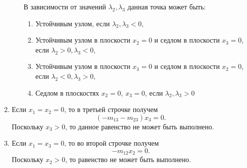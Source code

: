 \begin{enumerate}
\begin{enumerate}
            В зависимости от значений \( \lambda_2, \lambda_3 \) данная точка может быть:
            \begin{enumerate}
                \item Устойчивым узлом, если \( \lambda_2, \lambda_3 < 0 \),
                \item Устойчивым узлом в плоскости \( x_2 = 0 \) и седлом в плоскости \( x_3 = 0 \), если \( \lambda_2 > 0, \lambda_3 < 0 \),
                \item Устойчивым узлом в плоскости \( x_3 = 0 \) и седлом в плоскости \( x_2 = 0 \), если \( \lambda_2 < 0, \lambda_3 > 0 \),
                \item Седлом в плоскостях \( x_2 = 0, ~ x_3 = 0 \), если \( \lambda_2, \lambda_3 > 0 \)
            \end{enumerate}
            
            
        \end{enumerate}


        \item Если \( x_1 = x_2 = 0 \), то в третьей строчке получем
        \[ \left( -m_{13} -m_{23} \right) x_3 = 0. \]
        Поскольку \( x_3 > 0\), то данное равенство не может быть выполнено.


        \item Если \( x_1 = x_3 = 0 \), то во второй строчке получем
        \[ -m_{12} x_2 = 0. \]
        Поскольку \( x_2 > 0 \), то равенство не может быть выполнено.



\end{enumerate}

